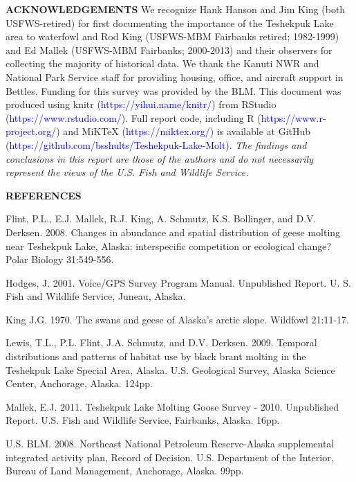\documentclass[]{article}
\begin{document}
\textbf{ACKNOWLEDGEMENTS}\newline
We recognize Hank Hanson and Jim King (both USFWS-retired) for first
documenting the importance of the Teshekpuk Lake area to waterfowl and
Rod King (USFWS-MBM Fairbanks retired; 1982-1999) and Ed Mallek
(USFWS-MBM Fairbanks; 2000-2013) and their observers for collecting the
majority of historical data. We thank the Kanuti NWR and National Park
Service staff for providing housing, office, and aircraft support in
Bettles. Funding for this survey was provided by the BLM. This document
was produced using knitr (\textcolor{blue}{https://yihui.name/knitr/})
from RStudio (\textcolor{blue}{https://www.rstudio.com/}). Full report
code, including R (\textcolor{blue}{https://www.r-project.org/}) and
MiKTeX (\textcolor{blue}{https://miktex.org/}) is available at GitHub
(\textcolor{blue}{https://github.com/bsshults/Teshekpuk-Lake-Molt}).
\newline
\textit{\small{The findings and conclusions in this report are those of the authors and do not necessarily represent the views of the U.S. Fish and Wildlife Service.}}

\newpage%
\textbf{REFERENCES}

\setlength{\parindent}{-0.2in} \setlength{\leftskip}{0.2in}
\setlength{\parskip}{1ex}

Flint, P.L., E.J. Mallek, R.J. King, A. Schmutz, K.S. Bollinger, and
D.V. Derksen. 2008. Changes in abundance and spatial distribution of
geese molting near Teshekpuk Lake, Alaska: interspecific competition or
ecological change? Polar Biology 31:549-556.

Hodges, J. 2001. Voice/GPS Survey Program Manual. Unpublished Report. U.
S. Fish and Wildlife Service, Juneau, Alaska.

King J.G. 1970. The swans and geese of Alaska's arctic slope. Wildfowl
21:11-17.

Lewis, T.L., P.L. Flint, J.A. Schmutz, and D.V. Derksen. 2009. Temporal
distributions and patterns of habitat use by black brant molting in the
Teshekpuk Lake Special Area, Alaska. U.S. Geological Survey, Alaska
Science Center, Anchorage, Alaska. 124pp.

Mallek, E.J. 2011. Teshekpuk Lake Molting Goose Survey - 2010.
Unpublished Report. U.S. Fish and Wildlife Service, Fairbanks, Alaska.
16pp.

U.S. BLM. 2008. Northeast National Petroleum Reserve-Alaska supplemental
integrated activity plan, Record of Decision. U.S. Department of the
Interior, Bureau of Land Management, Anchorage, Alaska. 99pp.
\end{document}
